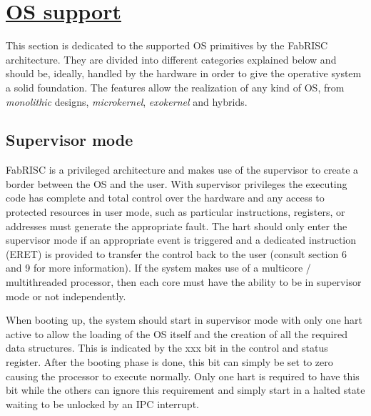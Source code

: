 \section[OS support]{\LARGE\underline{OS support}}

    \vspace{10pt}

    This section is dedicated to the supported OS primitives by the FabRISC architecture. They are divided into different categories explained below and should be, ideally, handled by the hardware in order to give the operative system a solid foundation. The features allow the realization of any kind of OS, from \textit{monolithic} designs, \textit{microkernel}, \textit{exokernel} and hybrids.

    \subsection{Supervisor mode}

        \vspace{10pt}

        FabRISC is a privileged architecture and makes use of the supervisor to create a border between the OS and the user. With supervisor privileges the executing code has complete and total control over the hardware and any access to protected resources in user mode, such as particular instructions, registers, or addresses must generate the appropriate fault. The hart should only enter the supervisor mode if an appropriate event is triggered and a dedicated instruction (ERET) is provided to transfer the control back to the user (consult section 6 and 9 for more information). If the system makes use of a multicore / multithreaded processor, then each core must have the ability to be in supervisor mode or not independently.

        \vspace{10pt}

        When booting up, the system should start in supervisor mode with only one hart active to allow the loading of the OS itself and the creation of all the required data structures. This is indicated by the xxx bit in the control and status register. After the booting phase is done, this bit can simply be set to zero causing the processor to execute normally. Only one hart is required to have this bit while the others can ignore this requirement and simply start in a halted state waiting to be unlocked by an IPC interrupt.

